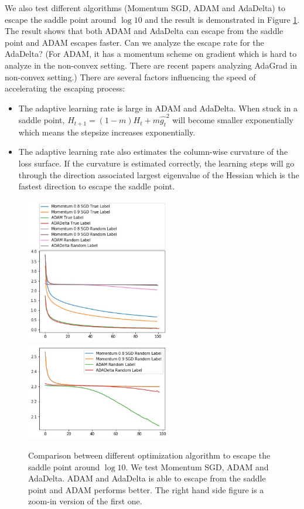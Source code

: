 \documentclass{article}
\theoremstyle{plain}
\theoremstyle{definition}
\begin{document}
We also test different algorithms (Momentum SGD, ADAM and AdaDelta) to escape the saddle point around $\log 10$ and the result is demonstrated in Figure \ref{optsadd}. The result shows that both ADAM and AdaDelta can escape from the saddle point and ADAM escapes faster. Can we analyze the escape rate for the AdaDelta? (For ADAM, it has a momentum scheme on gradient which is hard to analyze in the non-convex setting. There are recent papers analyzing AdaGrad in non-convex setting.) There are several factors influencing the speed of accelerating the escaping process:

\begin{itemize}
	\item The adaptive learning rate is large in ADAM and AdaDelta. When stuck in a saddle point, $H_{t+1}=(1-m)H_t+m\hat{g_t}^2$ will become smaller exponentially which means the stepsize increases exponentially.
	\item The adaptive learning rate also estimates the column-wise curvature of the loss surface. If the curvature is estimated correctly, the learning steps will go through the direction associated largest eigenvalue of the Hessian which is the fastest direction to escape the saddle point.
\end{itemize}

\begin{figure}[H]
	\centering
	\includegraphics[width=2.5in]{opt.jpg}
	\includegraphics[width=2.5in]{saddle.jpg}
	\caption{Comparison between different optimization algorithm to escape the saddle point around $\log 10$. We test Momentum SGD, ADAM and AdaDelta. ADAM and AdaDelta is able to escape from the saddle point and ADAM performs better. The right hand side figure is a zoom-in version of the first one.}
	\label{optsadd}
\end{figure}
\end{document}
